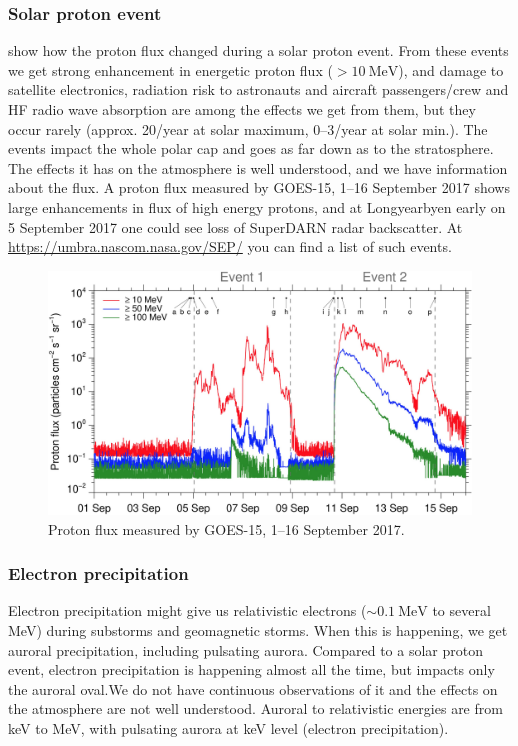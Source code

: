 \subsubsection{Solar proton event}
 show how the proton flux changed during a solar proton event. From these events we get strong enhancement in energetic proton flux (\(>\SI{10}{\mega\electronvolt}\)), and damage to satellite electronics, radiation risk to astronauts and aircraft passengers/crew and HF radio wave absorption are among the effects we get from them, but they occur rarely (approx. 20/year at solar maximum, 0--3/year at solar min.). The events impact the whole polar cap and goes as far down as to the stratosphere. The effects it has on the atmosphere is well understood, and we have information about the flux. A proton flux measured by GOES-15, 1--16 September 2017 shows large enhancements in flux of high energy protons, and at Longyearbyen early on 5 September 2017 one could see loss of SuperDARN radar backscatter. At \url{https://umbra.nascom.nasa.gov/SEP/} you can find a list of such events.
\begin{figure}[t]
    \centering
    \includegraphics[width=.8\linewidth]{bilder/L6_solar_proton_event.jpg}
    \caption{Proton flux measured by GOES-15, 1--16 September 2017.}\label{fig:L6_solar_proton_event}
\end{figure}

\subsubsection{Electron precipitation}
Electron precipitation might give us relativistic electrons (\(\sim\SI{0.1}{\mega\electronvolt}\) to several \si{\mega\electronvolt}) during substorms and geomagnetic storms. When this is happening, we get auroral precipitation, including pulsating aurora. Compared to a solar proton event, electron precipitation is happening almost all the time, but impacts only the auroral oval.We do not have continuous observations of it and the effects on the atmosphere are not well understood. Auroral to relativistic energies are from \si{\kilo\electronvolt} to \si{\mega\electronvolt}, with pulsating aurora at keV level (electron precipitation).

